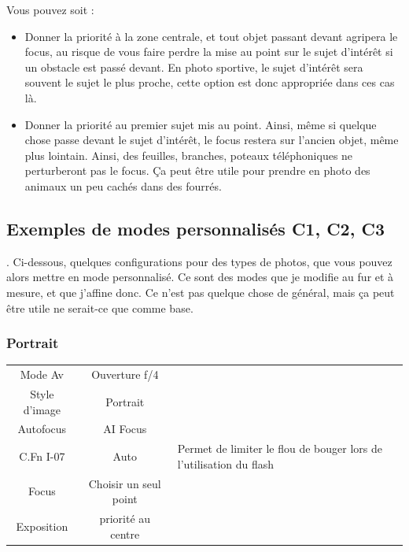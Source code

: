 \documentclass[a4paper,twoside]{article}
\begin{document}
Vous pouvez soit :
\begin{itemize}
\item Donner la priorité à la zone centrale, et tout objet passant devant agripera le focus, au risque de vous faire perdre la mise au point sur le sujet d'intérêt si un obstacle est passé devant. En photo sportive, le sujet d'intérêt sera souvent le sujet le plus proche, cette option est donc appropriée dans ces cas là.
\item Donner la priorité au premier sujet mis au point. Ainsi, même si quelque chose passe devant le sujet d'intérêt, le focus restera sur l'ancien objet, même plus lointain. Ainsi, des feuilles, branches, poteaux téléphoniques ne perturberont pas le focus. Ça peut être utile pour prendre en photo des animaux un peu cachés dans des fourrés.
\end{itemize}

\subsection{Exemples de modes personnalisés C1, C2, C3}\label{sec:exemple_C1C2C3}.
Ci-dessous, quelques configurations pour des types de photos, que vous pouvez alors mettre en mode personnalisé. Ce sont des modes que je modifie au fur et à mesure, et que j'affine donc. Ce n'est pas quelque chose de général, mais ça peut être utile ne serait-ce que comme base.

\subsubsection{Portrait}

\begin{tabular}{|c|c|p{5cm}|}
Mode Av & Ouverture f/4\\
Style d'image & Portrait\\
Autofocus & AI Focus \\
C.Fn I-07 & Auto & Permet de limiter le flou de bouger lors de l'utilisation du flash\\
Focus & Choisir un seul point\\
Exposition & priorité au centre
\end{tabular}


\printindex
\end{document}

